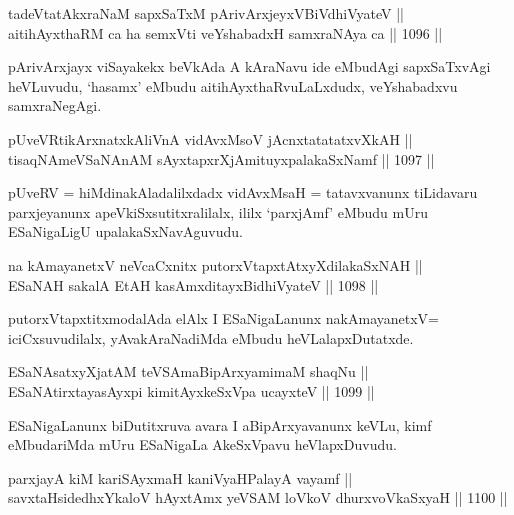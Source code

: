 \begin{shl}
tadeVtatAkxraNaM sapxSaTxM pArivArxjeyxV\s BiVdhiVyateV || \\
aitihAyxthaRM ca ha semxVti veYshabadxH samxraNAya ca ||  1096 ||  
\end{shl}

\begin{artha}
pArivArxjayx viSayakekx beVkAda A kAraNavu ide eMbudAgi sapxSaTxvAgi heVLuvudu, `hasamx' eMbudu aitihAyxthaRvuLaLxdudx, veYshabadxvu samxraNegAgi.
\end{artha}

\begin{shl}
pUveVR\s tikArxnatxkAliVnA vidAvxMsoV jAcnxtatatatxvXkAH || \\
tisaqNAmeVSaNAnAM sAyxtapxrXjAmituyxpalakaSxNamf ||  1097 ||  
\end{shl}

\begin{artha}
pUveRV = hiMdinakAladalilxdadx vidAvxMsaH = tatavxvanunx tiLidavaru parxjeyanunx apeVkiSxsutitxralilalx, ililx `parxjAmf' eMbudu mUru ESaNigaLigU upalakaSxNavAguvudu.
\end{artha}

\begin{shl}
na kAmayanetxV neVcaCxnitx putorxVtapxtAtxyXdilakaSxNAH || \\
ESaNAH sakalA EtAH kasAmxditayxBidhiVyateV ||  1098 ||  
\end{shl}

\begin{artha}
putorxVtapxtitxmodalAda elAlx I ESaNigaLanunx nakAmayanetxV= iciCxsuvudilalx, yAvakAraNadiMda eMbudu heVLalapxDutatxde.
\end{artha}

\begin{shl}
ESaNAsatxyXjatAM teVSAmaBipArxyamimaM shaqNu ||  \\
ESaNAtirxtayasAyxpi kimitAyxkeSxVpa ucayxteV ||  1099 ||  
\end{shl}

\begin{artha}
ESaNigaLanunx biDutitxruva avara I aBipArxyavanunx keVLu, kimf  eMbudariMda mUru ESaNigaLa AkeSxVpavu heVlapxDuvudu.
\end{artha}

\begin{shl}
parxjayA kiM kariSAyxmaH kaniVyaHPalayA vayamf || \\
savxtaHsidedhxYkaloV hAyxtAmx yeVSAM loVkoV dhurxvoV\s kaSxyaH ||  1100 ||  
\end{shl}

